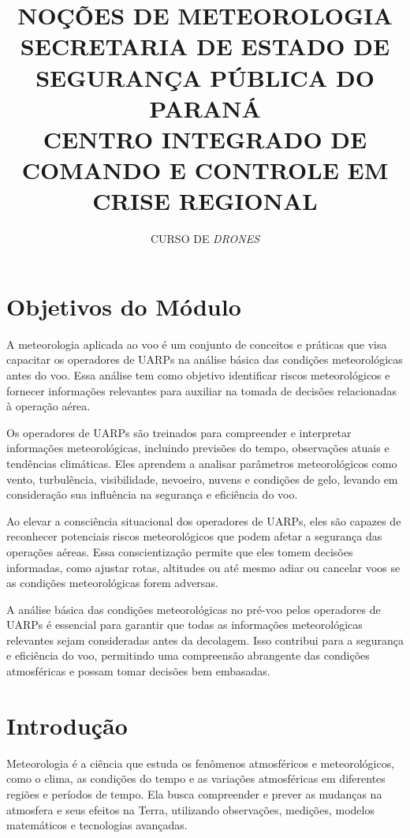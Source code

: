 \documentclass[a4paper, 12pt, onecolumn,singlespacing]{article}
\title{NOÇÕES DE METEOROLOGIA\\SECRETARIA DE ESTADO DE SEGURANÇA PÚBLICA DO PARANÁ\\CENTRO INTEGRADO DE COMANDO E CONTROLE EM CRISE REGIONAL}
\author[1]{CURSO DE \textit{DRONES}}
\affil[1]{EQUIPE TÉCNICA CICCR}
\begin{document}
	
	\maketitle
	
	\section{Objetivos do Módulo}
	
	A meteorologia aplicada ao voo é um conjunto de conceitos e práticas que visa capacitar os operadores de UARPs na análise básica das condições meteorológicas antes do voo. Essa análise tem como objetivo identificar riscos meteorológicos e fornecer informações relevantes para auxiliar na tomada de decisões relacionadas à operação aérea.
	
	Os operadores de UARPs são treinados para compreender e interpretar informações meteorológicas, incluindo previsões do tempo, observações atuais e tendências climáticas. Eles aprendem a analisar parâmetros meteorológicos como vento, turbulência, visibilidade, nevoeiro, nuvens e condições de gelo, levando em consideração sua influência na segurança e eficiência do voo.
	
	Ao elevar a consciência situacional dos operadores de UARPs, eles são capazes de reconhecer potenciais riscos meteorológicos que podem afetar a segurança das operações aéreas. Essa conscientização permite que eles tomem decisões informadas, como ajustar rotas, altitudes ou até mesmo adiar ou cancelar voos se as condições meteorológicas forem adversas.
	
	A análise básica das condições meteorológicas no pré-voo pelos operadores de UARPs é essencial para garantir que todas as informações meteorológicas relevantes sejam consideradas antes da decolagem. Isso contribui para a segurança e eficiência do voo, permitindo uma compreensão abrangente das condições atmosféricas e possam tomar decisões bem embasadas.
	
	\section{Introdução}
	
	Meteorologia é a ciência que estuda os fenômenos atmosféricos e meteorológicos, como o clima, as condições do tempo e as variações atmosféricas em diferentes regiões e períodos de tempo. Ela busca compreender e prever as mudanças na atmosfera e seus efeitos na Terra, utilizando observações, medições, modelos matemáticos e tecnologias avançadas.
	
\end{document}
